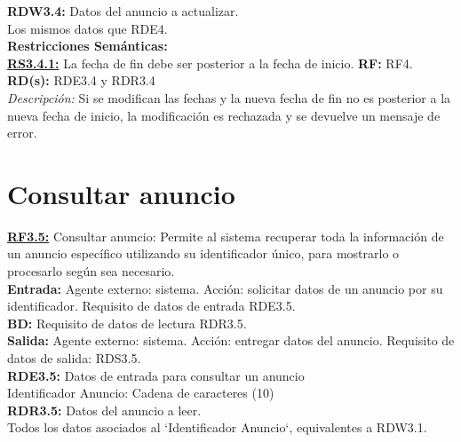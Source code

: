 \textcolor{azul}{\textbf{RDW3.4:}} Datos del anuncio a actualizar. \\
\hspace*{1cm} Los mismos datos que RDE4. \\[12pt]


\textbf{\textcolor{verde}{Restricciones Semánticas:}} \\[6pt]
\textbf{\textcolor{verde}{\underline{RS3.4.1:}}} La fecha de fin debe ser posterior a la fecha de inicio. \textbf{RF:} RF4. \textbf{RD(s):} RDE3.4 y RDR3.4 \\
\hspace*{1cm} \textit{Descripción:} Si se modifican las fechas y la nueva fecha de fin no es posterior a la nueva fecha de inicio, la modificación es rechazada y se devuelve un mensaje de error.

\section{Consultar anuncio}
\textbf{\textcolor{rojo}{\underline{RF3.5:}}} Consultar anuncio: Permite al sistema recuperar toda la información de un anuncio específico utilizando su identificador único, para mostrarlo o procesarlo según sea necesario.\\[6pt]

\textbf{\textcolor{rojo}{Entrada:}} Agente externo: sistema. Acción: solicitar datos de un anuncio por su identificador. 
Requisito de datos de entrada \textcolor{azul}{RDE3.5}. \\[6pt]

\textbf{\textcolor{rojo}{BD:}} Requisito de datos de lectura \textcolor{azul}{RDR3.5}. \\[6pt]

\textbf{\textcolor{rojo}{Salida:}} Agente externo: sistema. Acción: entregar datos del anuncio. 
Requisito de datos de salida: \textcolor{azul}{RDS3.5}. \\[12pt]

\textcolor{azul}{\textbf{RDE3.5:}} Datos de entrada para consultar un anuncio \\
\hspace*{1cm} Identificador Anuncio: Cadena de caracteres (10) \\[12pt]

\textcolor{azul}{\textbf{RDR3.5:}} Datos del anuncio a leer. \\
\hspace*{1cm} Todos los datos asociados al `Identificador Anuncio`, equivalentes a RDW3.1. \\[12pt]

